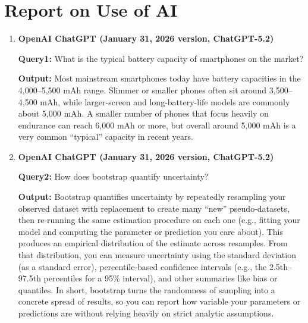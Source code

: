 \documentclass{mcmthesis}
\begin{document}
\newpage
\section*{Report on Use of AI}

\begin{enumerate}
    \item \textbf{OpenAI ChatGPT (January 31, 2026 version, ChatGPT-5.2)}
    
    \textbf{Query1:} What is the typical battery capacity of smartphones on the market?
    
    \textbf{Output:} Most mainstream smartphones today have battery capacities in the 4,000–5,500 mAh range. Slimmer or smaller phones often sit around 3,500–4,500 mAh, while larger-screen and long-battery-life models are commonly about 5,000 mAh. A smaller number of phones that focus heavily on endurance can reach 6,000 mAh or more, but overall around 5,000 mAh is a very common “typical” capacity in recent years.

    \item \textbf{OpenAI ChatGPT (January 31, 2026 version, ChatGPT-5.2)}
    
    \textbf{Query2:} How does bootstrap quantify uncertainty?
    
    \textbf{Output:} Bootstrap quantifies uncertainty by repeatedly resampling your observed dataset with replacement to create many “new” pseudo-datasets, then re-running the same estimation procedure on each one (e.g., fitting your model and computing the parameter or prediction you care about). This produces an empirical distribution of the estimate across resamples. From that distribution, you can measure uncertainty using the standard deviation (as a standard error), percentile-based confidence intervals (e.g., the 2.5th–97.5th percentiles for a 95\% interval), and other summaries like bias or quantiles. In short, bootstrap turns the randomness of sampling into a concrete spread of results, so you can report how variable your parameters or predictions are without relying heavily on strict analytic assumptions.
\end{enumerate}
\end{document}

